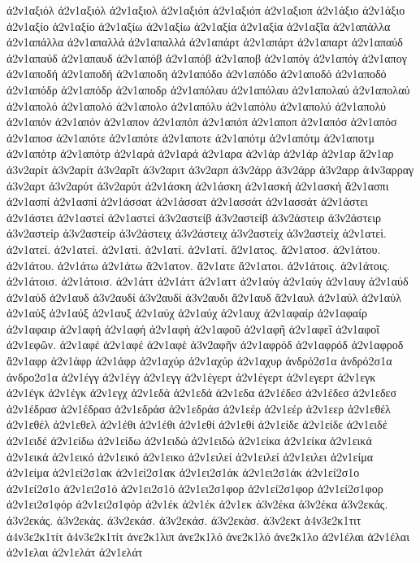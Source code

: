{ἀ2ν1αξιόλ  ἀ2ν1αξιόλ
ἀ2ν1αξιολ
ἀ2ν1αξιόπ  ἀ2ν1αξιόπ
ἀ2ν1αξιοπ
ἀ2ν1άξιο  ἀ2ν1άξιο
ἀ2ν1αξίο  ἀ2ν1αξίο
ἀ2ν1αξίω  ἀ2ν1αξίω
ἀ2ν1αξία  ἀ2ν1αξία
ἀ2ν1αξῖα
ἀ2ν1απάλλα  ἀ2ν1απάλλα
ἀ2ν1απαλλά  ἀ2ν1απαλλά
ἀ2ν1απάρτ  ἀ2ν1απάρτ
ἀ2ν1απαρτ
ἀ2ν1απαύδ  ἀ2ν1απαύδ
ἀ2ν1απαυδ
ἀ2ν1απόβ  ἀ2ν1απόβ
ἀ2ν1αποβ
ἀ2ν1απόγ  ἀ2ν1απόγ
ἀ2ν1απογ
ἀ2ν1αποδή  ἀ2ν1αποδή
ἀ2ν1αποδη
ἀ2ν1απόδο  ἀ2ν1απόδο
ἀ2ν1αποδό  ἀ2ν1αποδό
ἀ2ν1απόδρ  ἀ2ν1απόδρ
ἀ2ν1αποδρ
ἀ2ν1απόλαυ  ἀ2ν1απόλαυ
ἀ2ν1απολαύ  ἀ2ν1απολαύ
ἀ2ν1απολό  ἀ2ν1απολό
ἀ2ν1απολο
ἀ2ν1απόλυ  ἀ2ν1απόλυ
ἀ2ν1απολύ  ἀ2ν1απολύ
ἀ2ν1απόν  ἀ2ν1απόν
ἀ2ν1απον
ἀ2ν1απόπ  ἀ2ν1απόπ
ἀ2ν1αποπ
ἀ2ν1απόσ  ἀ2ν1απόσ
ἀ2ν1αποσ
ἀ2ν1απότε  ἀ2ν1απότε
ἀ2ν1αποτε
ἀ2ν1απότμ  ἀ2ν1απότμ
ἀ2ν1αποτμ
ἀ2ν1απότρ  ἀ2ν1απότρ
ἀ2ν1αρά  ἀ2ν1αρά
ἀ2ν1αρα
ἀ2ν1άρ  ἀ2ν1άρ
ἀ2ν1αρ
ἄ2ν1αρ
ἀ3ν2αρίτ  ἀ3ν2αρίτ
ἀ3ν2αρῖτ
ἀ3ν2αριτ
ἀ3ν2αρπ
ἀ3ν2άρρ  ἀ3ν2άρρ
ἀ3ν2αρρ
ἀ4ν3αρραγ
ἀ3ν2αρτ
ἀ3ν2αρύτ  ἀ3ν2αρύτ
ἀ2ν1άσκη  ἀ2ν1άσκη
ἀ2ν1ασκή  ἀ2ν1ασκή
ἄ2ν1ασπι
ἀ2ν1ασπί  ἀ2ν1ασπί
ἀ2ν1άσσατ  ἀ2ν1άσσατ
ἀ2ν1ασσάτ  ἀ2ν1ασσάτ
ἀ2ν1άστει  ἀ2ν1άστει
ἀ2ν1αστεί  ἀ2ν1αστεί
ἀ3ν2αστείβ  ἀ3ν2αστείβ
ἀ3ν2άστειρ  ἀ3ν2άστειρ
ἀ3ν2αστείρ  ἀ3ν2αστείρ
ἀ3ν2άστειχ  ἀ3ν2άστειχ
ἀ3ν2αστείχ  ἀ3ν2αστείχ
ἀ2ν1ατεὶ.
ἀ2ν1ατεί.  ἀ2ν1ατεί.
ἀ2ν1ατὶ.
ἀ2ν1ατί.  ἀ2ν1ατί.
ἄ2ν1ατος.
ἄ2ν1ατοσ.
ἀ2ν1άτου.  ἀ2ν1άτου.
ἀ2ν1άτω  ἀ2ν1άτω
ἄ2ν1ατον.
ἄ2ν1ατε
ἄ2ν1ατοι.
ἀ2ν1άτοις.  ἀ2ν1άτοις.
ἀ2ν1άτοισ.  ἀ2ν1άτοισ.
ἀ2ν1άττ  ἀ2ν1άττ
ἀ2ν1αττ
ἀ2ν1αύγ  ἀ2ν1αύγ
ἀ2ν1αυγ
ἀ2ν1αύδ  ἀ2ν1αύδ
ἀ2ν1αυδ
ἀ3ν2αυδί  ἀ3ν2αυδί
ἀ3ν2αυδι
ἄ2ν1αυδ
ἄ2ν1αυλ
ἀ2ν1αύλ  ἀ2ν1αύλ
ἀ2ν1αύξ  ἀ2ν1αύξ
ἀ2ν1αυξ
ἀ2ν1αύχ  ἀ2ν1αύχ
ἀ2ν1αυχ
ἀ2ν1αφαίρ  ἀ2ν1αφαίρ
ἀ2ν1αφαιρ
ἀ2ν1αφή  ἀ2ν1αφή
ἀ2ν1αφὴ
ἀ2ν1αφοῦ
ἀ2ν1αφῆ
ἀ2ν1αφεῖ
ἀ2ν1αφοῖ
ἀ2ν1εφῶν.
ἀ2ν1αφέ  ἀ2ν1αφέ
ἀ2ν1αφὲ
ἀ3ν2αφῆν
ἀ2ν1αφρόδ  ἀ2ν1αφρόδ
ἀ2ν1αφροδ
ἄ2ν1αφρ
ἀ2ν1άφρ  ἀ2ν1άφρ
ἀ2ν1αχύρ  ἀ2ν1αχύρ
ἀ2ν1αχυρ
ἀνδρό2σ1α  ἀνδρό2σ1α
ἀνδρο2σ1α
ἀ2ν1έγγ  ἀ2ν1έγγ
ἀ2ν1εγγ
ἀ2ν1έγερτ  ἀ2ν1έγερτ
ἀ2ν1εγερτ
ἀ2ν1εγκ
ἀ2ν1έγκ  ἀ2ν1έγκ
ἀ2ν1εγχ
ἀ2ν1εδά  ἀ2ν1εδά
ἀ2ν1εδα
ἀ2ν1έδεσ  ἀ2ν1έδεσ
ἀ2ν1εδεσ
ἀ2ν1έδρασ  ἀ2ν1έδρασ
ἀ2ν1εδράσ  ἀ2ν1εδράσ
ἀ2ν1εέρ  ἀ2ν1εέρ
ἀ2ν1εερ
ἀ2ν1εθέλ  ἀ2ν1εθέλ
ἀ2ν1εθελ
ἀ2ν1έθι  ἀ2ν1έθι
ἀ2ν1εθί  ἀ2ν1εθί
ἀ2ν1είδε  ἀ2ν1είδε
ἀ2ν1ειδέ  ἀ2ν1ειδέ
ἀ2ν1είδω  ἀ2ν1είδω
ἀ2ν1ειδώ  ἀ2ν1ειδώ
ἀ2ν1είκα  ἀ2ν1είκα
ἀ2ν1εικά  ἀ2ν1εικά
ἀ2ν1εικό  ἀ2ν1εικό
ἀ2ν1εικο
ἀ2ν1ειλεί  ἀ2ν1ειλεί
ἀ2ν1ειλει
ἀ2ν1είμα  ἀ2ν1είμα
ἀ2ν1εί2σ1ακ  ἀ2ν1εί2σ1ακ
ἀ2ν1ει2σ1άκ  ἀ2ν1ει2σ1άκ
ἀ2ν1εί2σ1ο  ἀ2ν1εί2σ1ο
ἀ2ν1ει2σ1ό  ἀ2ν1ει2σ1ό
ἀ2ν1ει2σ1φορ
ἀ2ν1εί2σ1φορ  ἀ2ν1εί2σ1φορ
ἀ2ν1ει2σ1φόρ  ἀ2ν1ει2σ1φόρ
ἀ2ν1έκ  ἀ2ν1έκ
ἀ2ν1εκ
ἀ3ν2έκα  ἀ3ν2έκα
ἀ3ν2εκάς.  ἀ3ν2εκάς.
ἀ3ν2εκὰς.
ἀ3ν2εκάσ.  ἀ3ν2εκάσ.
ἀ3ν2εκὰσ.
ἀ3ν2εκτ
ἀ4ν3ε2κ1τιτ
ἀ4ν3ε2κ1τίτ  ἀ4ν3ε2κ1τίτ
ἀνε2κ1λιπ
ἀνε2κ1λό  ἀνε2κ1λό
ἀνε2κ1λο
ἀ2ν1έλαι  ἀ2ν1έλαι
ἀ2ν1ελαι
ἀ2ν1ελάτ  ἀ2ν1ελάτ
}
